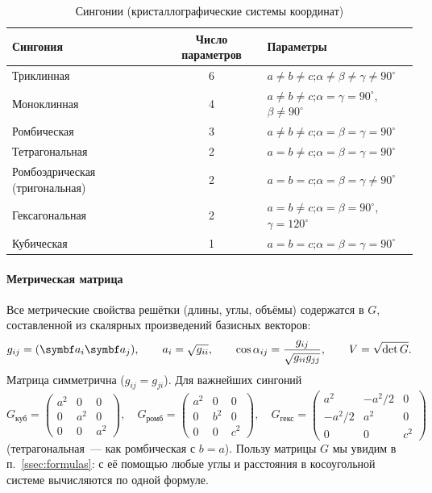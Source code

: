 \begin{table}[ht]
\centering
\caption{Сингонии (кристаллографические системы координат)}\label{tab:syngonies}
\small
\begin{tabular}{@{}lcl@{}}
\toprule
Сингония & Число параметров & Параметры \\
\midrule
Триклинная & 6 & $a\ne b\ne c$;\quad $\alpha\ne\beta\ne\gamma\ne90^\circ$ \\
Моноклинная & 4 & $a\ne b\ne c$;\quad $\alpha=\gamma=90^\circ$, $\beta\ne90^\circ$ \\
Ромбическая & 3 & $a\ne b\ne c$;\quad $\alpha=\beta=\gamma=90^\circ$ \\
Тетрагональная & 2 & $a=b\ne c$;\quad $\alpha=\beta=\gamma=90^\circ$ \\
Ромбоэдрическая (тригональная) & 2 & $a=b=c$;\quad $\alpha=\beta=\gamma\ne90^\circ$ \\
Гексагональная & 2 & $a=b\ne c$;\quad $\alpha=\beta=90^\circ$, $\gamma=120^\circ$ \\
Кубическая & 1 & $a=b=c$;\quad $\alpha=\beta=\gamma=90^\circ$ \\
\bottomrule
\end{tabular}
\end{table}

\paragraph{Метрическая матрица}
Все метрические свойства решётки (длины, углы, объёмы) содержатся в
 $G$, составленной из скалярных произведений
базисных векторов:
\begin{equation}\label{eq:G}
g_{ij}=(\vb a_i\vb a_j),\qquad a_i=\sqrt{g_{ii}},\qquad
\cos\alpha_{ij}=\frac{g_{ij}}{\sqrt{g_{ii}g_{jj}}},\qquad V=\sqrt{\det G} .
\end{equation}
Матрица симметрична ($g_{ij}=g_{ji}$). Для важнейших сингоний
\[
G_\text{куб}=\begin{pmatrix}a^2&0&0\\0&a^2&0\\0&0&a^2\end{pmatrix},\quad
G_\text{ромб}=\begin{pmatrix}a^2&0&0\\0&b^2&0\\0&0&c^2\end{pmatrix},\quad
G_\text{гекс}=\begin{pmatrix}a^2&-a^2/2&0\\-a^2/2&a^2&0\\0&0&c^2\end{pmatrix}
\]
(тетрагональная~— как ромбическая с $b=a$). Пользу матрицы $G$ мы увидим в
п.~\ref{ssec:formulas}: с её помощью любые углы и расстояния в
косоугольной системе вычисляются по одной формуле.

